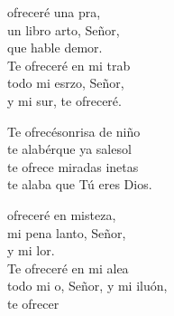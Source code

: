 \begin{cancion}%
	 ofreceré una pra, \\
	un libro arto, Señor,\\
	que hable demor. \\
	Te ofreceré en mi trab\\
	todo mi esrzo, Señor, \\
	y mi sur, te ofreceré.\jump\\
	\begin{chorus}%
		Te ofrecésonrisa de niño\\
		te alabérque ya salesol\\
		te ofrece miradas inetas \\
		te alaba que Tú eres Dios. \jump\\
	\end{chorus}%
	 ofreceré en misteza, \\
	mi pena lanto, Señor,\\
	y mi lor. \\
	Te ofreceré en mi alea\\
	todo mi o, Señor, y mi iluón,\\
	te ofrecer\\
\end{cancion}%
